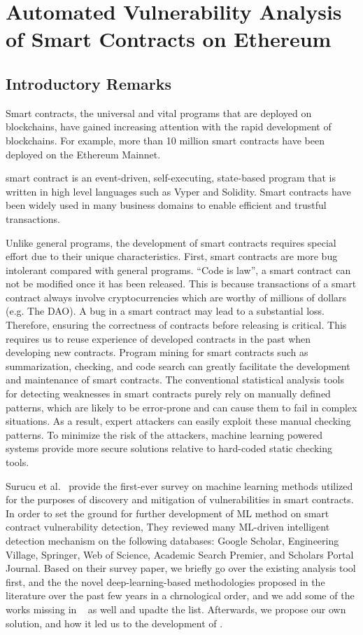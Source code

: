 \chapter{Automated Vulnerability Analysis of Smart Contracts on Ethereum} 
\label{ch:Slither-simil}

\section{Introductory Remarks}
Smart contracts, the universal and vital programs that are deployed on blockchains,
have gained increasing attention with the rapid development of blockchains.
For example, more than 10 million smart contracts have been deployed on the Ethereum Mainnet.

smart contract is an event-driven, self-executing, state-based program that is written in high level languages such as Vyper and Solidity.
Smart contracts have been widely used in many business domains to enable efficient and trustful transactions.

Unlike general programs, the development of smart contracts requires special effort due to their unique characteristics.
First, smart contracts are more bug intolerant compared with general programs.
“Code is law”, a smart contract can not be modified once it has been released. 
This is because transactions of a smart contract always involve cryptocurrencies which are worthy of millions of dollars (e.g. The DAO). 
A bug in a smart contract may lead to a substantial loss.
Therefore, ensuring the correctness of contracts before releasing is critical.
 This requires us to reuse experience of developed contracts in the past when developing new contracts.
Program mining for smart contracts such as summarization, checking, and code search can greatly facilitate the development and maintenance of smart contracts.
The conventional statistical analysis tools for detecting weaknesses in smart contracts purely rely on manually defined patterns, which are likely to be error-prone and can cause them to fail in complex situations.
As a result, expert attackers can easily exploit these manual checking patterns.
To minimize the risk of the attackers, machine learning powered systems provide more secure solutions relative to hard-coded
static checking tools.

Surucu et al.~\cite{surucu2022survey} provide the first-ever survey on machine learning methods utilized for the purposes of discovery and mitigation of vulnerabilities in smart contracts.
In order to set the ground for further development of ML method on smart contract vulnerability detection, They reviewed many ML-driven intelligent detection mechanism on the following databases:
Google Scholar, Engineering Village, Springer, Web of Science, Academic Search Premier, and Scholars Portal Journal.
Based on their survey paper, we briefly go over the existing analysis tool first, and the the novel deep-learning-based methodologies proposed in the literature over the past few years
in a chrnological order, and we add some of the works missing in ~\cite{surucu2022survey} as well and upadte the list.
Afterwards, we propose our own solution, \slithersimil and how it led us to the development of \etherbase.


